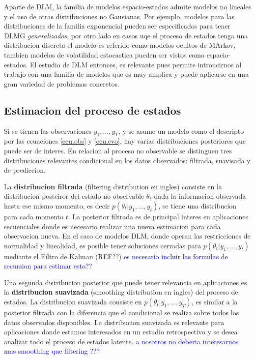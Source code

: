 \documentclass[12pt]{article}\usepackage[]{graphicx}\usepackage[]{color}
\begin{document}
Aparte de DLM, la familia de modelos espacio-estados admite modelos no lineales y el uso de otras distribuciones no Gausianas. Por ejemplo, modelos para las distribuciones de la familia exponencial pueden ser especificados para tener DLMG \textit{generalizados}, por otro lado en casos uqe el proceso de estados tenga una distribucion discreta el modelo es referido como modelos ocultos de MArkov, tambien modelos de volatilidad estocastica pueden ser vistos como espacio-estados. El estudio de DLM entonces, es relevante pues permite introucirnos al trabajo con una familia de modelos que es muy amplica y puede aplicarse en una gran variedad de problemas concretos. 



\subsection{Estimacion del proceso de estados}

Si se tienen las observaciones $y_1,\dots,y_T$, y se asume un modelo como el descripto por las ecuaciones \eqref{ecu.obs} y \eqref{ecu.evo}, hay varias distribuciones posteriores que puede ser de interes. En relacion al proceso no observable se distinguen tres distribuciones relevantes condicional en los datos observados: filtrada, suavisada y de prediccion. 

La \textbf{distribucion filtrada} (filtering distribution en ingles) consiste en la distribucion posteiror del estado no observable $\theta_t$ dada la informacion observada hasta ese mismo momento, es decir $p(\theta_t | y_1, \ldots, y_t)$, se tiene una distribucion para cada momento $t$. La posterior filtrada es de principal interes en aplicaciones secuenciales donde es necesario realizar una nueva estimacion para cada observacion nueva. En el caso de modelos DLM, donde operan las restricciones de normalidad y linealidad, es posible tener soluciones cerradas para $p(\theta_t | y_1, \ldots, y_t)$ mediante el Filtro de Kalman (REF??) \textcolor{blue}{es necesario incluir las formulas de recursion para estimar esto??}

Una segunda distribucion posterior que puede tener relevancia en aplicaciones es la \textbf{distribucion suavizada} (smoothing distribution en ingles) del proceso de estados. La distribucion suavizada consiste en $p(\theta_t | y_1, \ldots, y_T)$, es similar a la posterior filtrada con la diferencia que el condicional se realiza sobre todos los datos observados disponibles. La distribucion suavizada es relevante para aplicaciones donde estamos interesados en un estudio retrospectivo y se desea analizar todo el proceso de estados latente. \textcolor{blue}{a nosotros no deberia interesarnos mas smoothing que filtering ???}
\end{document}
